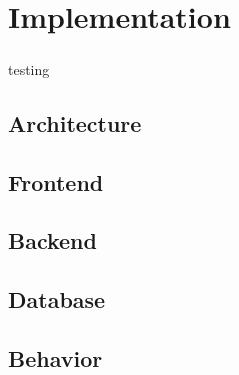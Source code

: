 \chapter{Implementation}

    \paragraph*{}
        testing


    \section{Architecture}
    
        \pagebreak


    \section{Frontend}

    \pagebreak

    \section{Backend}

    \pagebreak

    \section{Database}

    \pagebreak

    \section{Behavior}

    \pagebreak